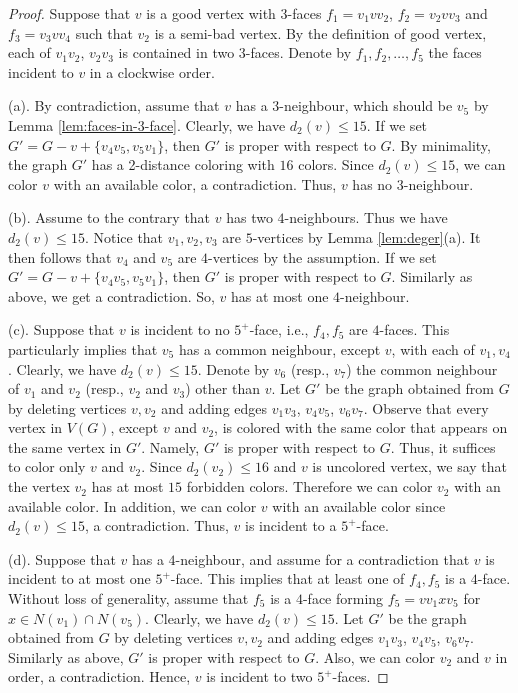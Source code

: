 \documentclass[12pt, reqno]{amsart}
\theoremstyle{plain}
\theoremstyle{definition}
\numberwithin{equation}{section}
\begin{document}
\begin{proof} Suppose that $v$ is a good vertex with $3$-faces $f_1=v_1vv_2$, $f_2=v_2vv_3$ and $f_3=v_3vv_4$ such that $v_2$ is a semi-bad vertex. By the definition of good vertex, each of  $v_1v_2$, $v_2v_3$ is contained in two $3$-faces. Denote by $f_1,f_2,\ldots,f_5$ the faces incident to $v$ in a clockwise order. 

(a). By contradiction, assume that $v$ has a $3$-neighbour, which should be $v_5$ by Lemma \ref{lem:faces-in-3-face}. Clearly, we have $d_2(v)\leq 15$. If we set $G'=G-v+\{v_4v_5,v_5v_1\}$, 
then $G'$ is proper with respect to $G$. By minimality, the graph $G'$ has a 2-distance coloring with $16$ colors. Since  $d_2(v)\leq 15$, we can color $v$ with an available color, a contradiction.  Thus, $v$ has no $3$-neighbour.

(b). Assume to the contrary that $v$ has two $4$-neighbours. Thus we have  $d_2(v)\leq 15$.  Notice that $v_1,v_2,v_3$ are $5$-vertices by Lemma \ref{lem:deger}(a). %
It then follows that $v_4$ and $v_5$ are $4$-vertices by the assumption.
If we set $G'=G-v+\{v_4v_5,v_5v_1\}$, then $G'$ is proper with respect to $G$.  Similarly as above, we get a contradiction. So, $v$ has at most one $4$-neighbour.


(c). Suppose that $v$ is incident to no $5^+$-face, i.e., $f_4,f_5$ are $4$-faces. This particularly implies that $v_5$ has a common neighbour, except $v$, with each of $v_1,v_4$.  Clearly, we have $d_2(v)\leq 15$.  
Denote by $v_6$ (resp., $v_7$) the common neighbour of $v_1$ and $v_2$ (resp., $v_2$ and $v_3$) other than $v$.
Let $G'$ be the graph obtained from $G$ by deleting vertices $v,v_2$ and adding edges $v_1v_3$, $v_4v_5$, $v_6v_7$. Observe that every vertex in $V(G)$, except $v$ and $v_2$, is colored with the same color that appears on the same vertex in $G'$. Namely, $G'$ is proper with respect to $G$. Thus, it suffices to color only $v$ and $v_2$. Since $d_2(v_2)\leq 16$ and $v$ is uncolored vertex, we say that the vertex $v_2$ has at most $15$ forbidden colors. Therefore we can color $v_2$ with an available color. In addition, we can color $v$ with an available color since  $d_2(v)\leq 15$, a contradiction.  Thus, $v$ is incident to a $5^+$-face.


(d).  Suppose that $v$ has a $4$-neighbour, and assume for a contradiction that $v$ is incident to at most one $5^+$-face. This implies that at least one of $f_4,f_5$ is a $4$-face. Without loss of generality, assume that $f_5$ is a $4$-face forming $f_5=vv_1xv_5$ for $x\in N(v_1)\cap N(v_5)$.  Clearly, we have $d_2(v)\leq 15$. 
Let $G'$ be the graph obtained from $G$ by deleting vertices $v,v_2$ and adding edges $v_1v_3$, $v_4v_5$, $v_6v_7$. Similarly as above, $G'$ is proper with respect to $G$. Also, we can color $v_2$ and $v$ in order, a contradiction. Hence, $v$ is incident to two $5^+$-faces.


\end{proof}
\end{document}
